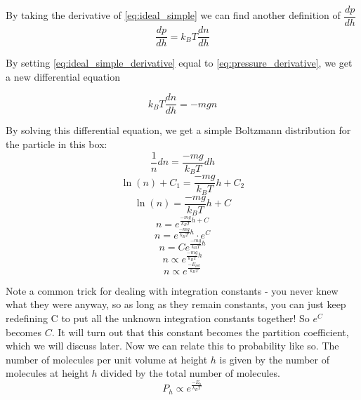 By taking the derivative of \ref{eq:ideal_simple} we can find another definition of $\dfrac{dp}{dh}$
\begin{equation}
    \dfrac{dp}{dh} = k_BT\dfrac{dn}{dh} \label{eq:ideal_simple_derivative}
\end{equation}

By setting \ref{eq:ideal_simple_derivative} equal to \ref{eq:pressure_derivative}, we get a new differential equation

\begin{equation}
    k_BT\dfrac{dn}{dh} = -mgn
\end{equation}

By solving this differential equation, we get a simple Boltzmann distribution for the particle in this box:
\begin{equation}
    \frac{1}{n}dn = \frac{-mg}{k_BT}dh
\end{equation}
\begin{equation}
    \ln(n) + C_1 = \frac{-mg}{k_BT}h + C_2
\end{equation}
\begin{equation}
    \ln(n) = \frac{-mg}{k_BT}h + C
\end{equation}
\begin{equation}
    n = e^{\frac{-mg}{k_BT}h + C}
\end{equation}
\begin{equation}
    n = e^{\frac{-mg}{k_BT}h}\cdot e^C
\end{equation}
\begin{equation}
    n = Ce^{\frac{-mg}{k_BT}h} \label{eq:with_C}
\end{equation}
\begin{equation}
    n \propto e^{\frac{-mg}{k_BT}h}
\end{equation}
\begin{equation}
    n \propto e^{\frac{-E_{pot}}{k_BT}} \label{eq:ideal_simple_bf}
\end{equation}

Note a common trick for dealing with integration constants - you never knew what they were anyway, so as long as they remain constants, you can just keep redefining C to put all the unknown integration constants together!
So $e^C$ becomes $C$.
It will turn out that this constant becomes the partition coefficient, which we will discuss later.
Now we can relate this to probability like so.
The number of molecules per unit volume at height $h$ is given by the number of molecules at height $h$ divided by the total number of molecules. 
\begin{equation}
    P_h \propto e^{\frac{-E_{h}}{k_BT}} \label{eq:prob_bf}
\end{equation}

